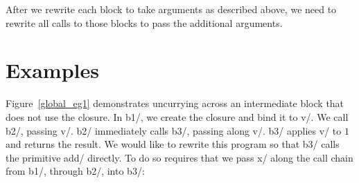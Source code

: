 After we rewrite each block to take arguments as described above, we need to
rewrite all calls to those blocks to pass the additional arguments. 

\section*{Examples}

Figure~\ref{global_eg1} demonstrates uncurrying across an intermediate
block that does not use the closure. In \lab b1/, we create the
closure \clo[k1:x] and bind it to \var v/. We call \lab b2/, passing
\var v/. \lab b2/ immediately calls \lab b3/, passing along \var
v/. \lab b3/ applies \var v/ to $1$ and returns the result. We would
like to rewrite this program so that \lab b3/ calls the primitive
\primlab add/ directly. To do so requires that we pass \var x/ along
the call chain from \lab b1/, through \lab b2/, into \lab b3/:

